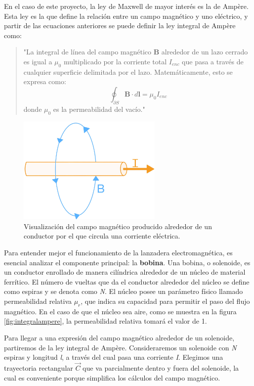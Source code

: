 En el caso de este proyecto, la ley de Maxwell de mayor interés es la de Ampère. Esta ley es la que define la relación entre un campo magnético y uno eléctrico, y partir de las ecuaciones anteriores se puede definir la ley integral de Ampère como:

\begin{quote}
    "La integral de línea del campo magnético \(\mathbf{B}\) alrededor de un lazo cerrado es igual a \(\mu_0\) multiplicado por la corriente total \(I_{enc}\) que pasa a través de cualquier superficie delimitada por el lazo. Matemáticamente, esto se expresa como:
    \[
    \oint_{\partial S} \mathbf{B} \cdot d\mathbf{l} = \mu_0 I_{enc}
    \]
    donde \(\mu_0\) es la permeabilidad del vacío."
\end{quote}

\begin{figure}[H]
    \centering %
    \includegraphics[width=7cm]{FigurasMemoria/amperelaw.jpg}
    \caption{Visualización del campo magnético producido alrededor de un conductor por el que circula una corriente eléctrica.}
    \label{fig:amperelaw} %
\end{figure}

Para entender mejor el funcionamiento de la lanzadera electromagnética, es esencial analizar el componente principal: la \textbf{bobina}. Una bobina, o solenoide, es un conductor enrollado de manera cilíndrica alrededor de un núcleo de material ferrítico. El número de vueltas que da el conductor alrededor del núcleo se define como espiras y se denota como \textit{N}. El núcleo posee un parámetro físico llamado permeabilidad relativa \(\mu_r\), que indica su capacidad para permitir el paso del flujo magnético. En el caso de que el núcleo sea aire, como se muestra en la figura \ref{fig:integralampere}, la permeabilidad relativa tomará el valor de 1.

Para llegar a una expresión del campo magnético alrededor de un solenoide, partiremos de la ley integral de Ampère. Consideraremos un solenoide con \textit{N} espiras y longitud \textit{l}, a través del cual pasa una corriente \textit{I}. Elegimos una trayectoria rectangular \(\vec{C}\) que va parcialmente dentro y fuera del solenoide, la cual es conveniente porque simplifica los cálculos del campo magnético.

